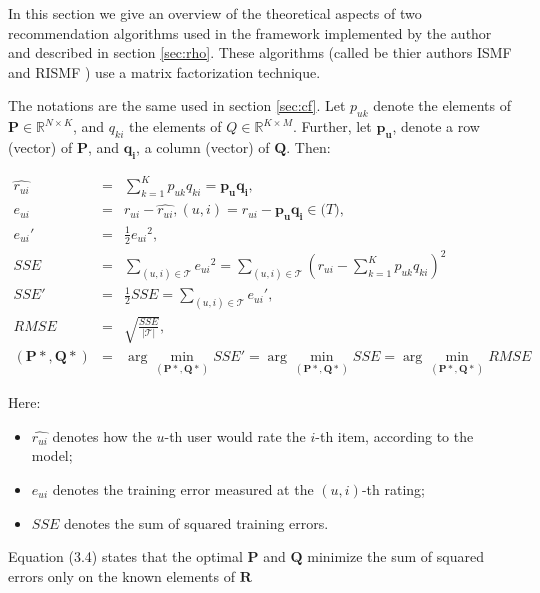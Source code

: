 \documentclass[10pt,a4paper]{article}  %
\begin{document}
In this section we give an overview of the theoretical aspects of two recommendation algorithms used in the framework implemented by the author and described in section \ref{sec:rho}. These algorithms (called be thier authors ISMF and RISMF \cite{takacs09scalable}) use a matrix factorization technique.

The notations are the same used in section \ref{sec:cf}. Let $p_{uk}$ denote the elements of $\mathbf{P} \in \mathbb{R}^{N \times K}$, and $q_{ki}$ the elements of $Q \in \mathbb{R}^{K \times M}$. Further, let $\mathbf{p_u}$, denote a row (vector) of $\mathbf{P}$, and $\mathbf{q_i}$, a column (vector) of $\mathbf{Q}$. Then:

\begin{eqnarray}
 \hat{r_{ui}}   &=& \sum_{k=1}^K p_{uk}q_{ki} = \mathbf{p_u}\mathbf{q_i}, \\
       e_{ui}   &=& r_{ui}-\hat{r_{ui}}, (u, i) = r_{ui} - {\mathbf{p_u}\mathbf{q_i}} \in \mathcal(T), \nonumber \\
       {e_{ui}}'&=& \frac{1}{2}{e_{ui}}^2, \\
       SSE      &=& \sum_{(u,i)\in \mathcal{T}} {e_{ui}}^2 = \sum_{(u,i)\in \mathcal{T}} {\left( r_{ui} - \sum_{k=1}^K p_{uk}q_{ki} \right)}^2 \nonumber \\
       SSE'     &=& \frac{1}{2}SSE = \sum_{(u,i)\in \mathcal{T}} {e_{ui}}', \nonumber \\
       RMSE     &=& \sqrt{\frac{SSE}{|\mathcal{T}|}}, \nonumber \\ 
       (\mathbf{P*}, \mathbf{Q*}) &=& \arg\!\min_{\boldsymbol{(\mathbf{P*}, \mathbf{Q*})}}SSE'  = \arg\!\min_{\boldsymbol{(\mathbf{P*}, \mathbf{Q*})}} SSE = \arg\!\min_{\boldsymbol{(\mathbf{P*}, \mathbf{Q*})}} RMSE \label{eq4}
\end{eqnarray}

Here:

\begin{itemize}
	\item $\hat{r_{ui}}$ denotes how the $u$-th user would rate the $i$-th item, according to the model;
	\item $e_{ui}$ denotes the training error measured at the $(u,i)$-th rating;
	\item $SSE$ denotes the sum of squared training errors.
\end{itemize}

Equation (3.4) states that the optimal $\mathbf{P}$ and $\mathbf{Q}$ minimize the sum of squared errors only on the known elements of $\mathbf{R}$
\end{document}

